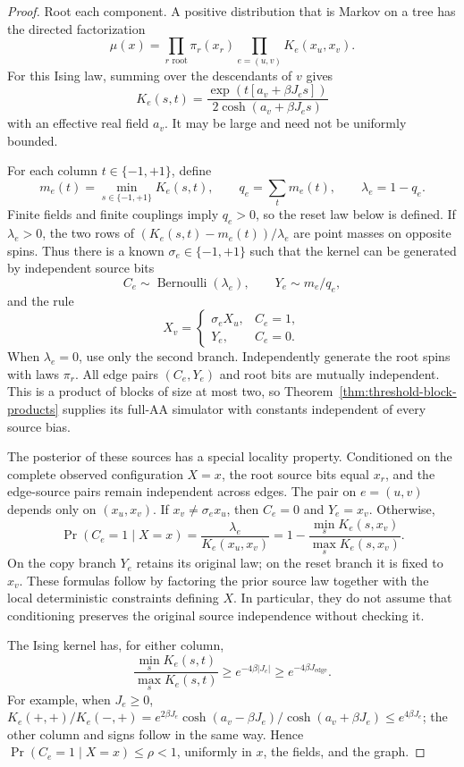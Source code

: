 \begin{proof}
Root each component. A positive distribution that is Markov on a tree
has the directed factorization
\[
 \mu(x)=\prod_{r\text{ root}}\pi_r(x_r)
          \prod_{e=(u,v)}K_e(x_u,x_v).
\]
For this Ising law, summing over the descendants of \(v\) gives
\[
 K_e(s,t)=\frac{\exp(t[a_v+\beta J_es])}
                    {2\cosh(a_v+\beta J_es)}
\]
with an effective real field \(a_v\). It may be large and need not be
uniformly bounded.

For each column \(t\in\{-1,+1\}\), define
\[
 m_e(t)=\min_{s\in\{-1,+1\}}K_e(s,t),\qquad
 q_e=\sum_t m_e(t),\qquad \lambda_e=1-q_e.
\]
Finite fields and finite couplings imply \(q_e>0\), so the reset law
below is defined. If \(\lambda_e>0\), the two rows of
\((K_e(s,t)-m_e(t))/\lambda_e\) are point masses on opposite spins.
Thus there is a known \(\sigma_e\in\{-1,+1\}\) such that the kernel
can be generated by independent source bits
\[
 C_e\sim\operatorname{Bernoulli}(\lambda_e),\qquad
 Y_e\sim m_e/q_e,
\]
and the rule
\[
 X_v=\begin{cases}
       \sigma_eX_u,& C_e=1,\\
       Y_e,& C_e=0.
      \end{cases}
\]
When \(\lambda_e=0\), use only the second branch. Independently
generate the root spins with laws \(\pi_r\). All edge pairs
\((C_e,Y_e)\) and root bits are mutually independent. This is a
product of blocks of size at most two, so
Theorem~\ref{thm:threshold-block-products} supplies its full-AA
simulator with constants independent of every source bias.

The posterior of these sources has a special locality property.
Conditioned on the complete observed configuration \(X=x\), the root
source bits equal \(x_r\), and the edge-source pairs remain independent
across edges. The pair on \(e=(u,v)\) depends only on \((x_u,x_v)\).
If \(x_v\ne\sigma_ex_u\), then \(C_e=0\) and \(Y_e=x_v\).
Otherwise,
\[
 \Pr(C_e=1\mid X=x)
   =\frac{\lambda_e}{K_e(x_u,x_v)}
   =1-\frac{\min_sK_e(s,x_v)}{\max_sK_e(s,x_v)}.
\]
On the copy branch \(Y_e\) retains its original law; on the reset
branch it is fixed to \(x_v\). These formulas follow by factoring the
prior source law together with the local deterministic constraints
defining \(X\). In particular, they do not assume that conditioning
preserves the original source independence without checking it.

The Ising kernel has, for either column,
\[
 \frac{\min_sK_e(s,t)}{\max_sK_e(s,t)}
       \ge e^{-4\beta|J_e|}\ge e^{-4\beta J_{\mathrm{edge}}}.
\]
For example, when \(J_e\ge0\),
\(K_e(+,+)/K_e(-,+)
 =e^{2\beta J_e}\cosh(a_v-\beta J_e)/\cosh(a_v+\beta J_e)
 \le e^{4\beta J_e}\); the other column and signs follow in the same
way. Hence \(\Pr(C_e=1\mid X=x)\le\rho<1\), uniformly in \(x\),
the fields, and the graph.


\end{proof}
